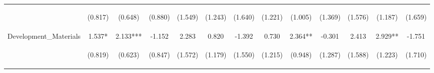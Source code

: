 \begin{tabular}{lcccccccccccc}
 & \begin{footnotesize}(0.817)\end{footnotesize} & \begin{footnotesize}(0.648)\end{footnotesize} & \begin{footnotesize}(0.880)\end{footnotesize} & \begin{footnotesize}(1.549)\end{footnotesize} & \begin{footnotesize}(1.243)\end{footnotesize} & \begin{footnotesize}(1.640)\end{footnotesize} & \begin{footnotesize}(1.221)\end{footnotesize} & \begin{footnotesize}(1.005)\end{footnotesize} & \begin{footnotesize}(1.369)\end{footnotesize} & \begin{footnotesize}(1.576)\end{footnotesize} & \begin{footnotesize}(1.187)\end{footnotesize} & \begin{footnotesize}(1.659)\end{footnotesize}\\
\noalign{\smallskip}Development\_Materials & 1.537* & 2.133*** & -1.152 & 2.283 & 0.820 & -1.392 & 0.730 & 2.364** & -0.301 & 2.413 & 2.929** & -1.751\\
 & \begin{footnotesize}(0.819)\end{footnotesize} & \begin{footnotesize}(0.623)\end{footnotesize} & \begin{footnotesize}(0.847)\end{footnotesize} & \begin{footnotesize}(1.572)\end{footnotesize} & \begin{footnotesize}(1.179)\end{footnotesize} & \begin{footnotesize}(1.550)\end{footnotesize} & \begin{footnotesize}(1.215)\end{footnotesize} & \begin{footnotesize}(0.948)\end{footnotesize} & \begin{footnotesize}(1.287)\end{footnotesize} & \begin{footnotesize}(1.588)\end{footnotesize} & \begin{footnotesize}(1.223)\end{footnotesize} & \begin{footnotesize}(1.710)\end{footnotesize}\\

\end{tabular}
